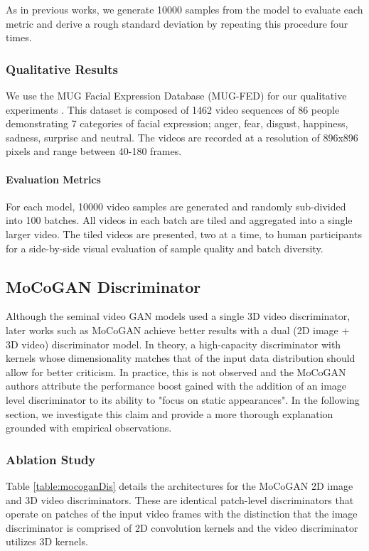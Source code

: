 \documentclass[a4paper,fleqn]{cas-sc}
\begin{document}
As in previous works, we generate 10000 samples from the model to evaluate each metric and derive a rough standard deviation by repeating this procedure four times. 

\subsubsection{Qualitative Results}
We use the MUG Facial Expression Database (MUG-FED) for our qualitative experiments \cite{AifantiPD10mug}. This dataset is composed of 1462 video sequences of 86 people demonstrating 7 categories of facial expression; anger, fear, disgust, happiness, sadness, surprise and neutral. The videos are recorded at a resolution of 896x896 pixels and range between 40-180 frames.

\paragraph{Evaluation Metrics} For each model, 10000 video samples are generated and randomly sub-divided into 100 batches. All videos in each batch are tiled and aggregated into a single larger video. The tiled videos are presented, two at a time, to human participants for a side-by-side visual evaluation of sample quality and batch diversity.


\subsection{MoCoGAN Discriminator}
\label{sec:mocogan}
Although the seminal video GAN models used a single 3D video discriminator, later works such as MoCoGAN achieve better results with a dual (2D image + 3D video) discriminator model. In theory, a high-capacity discriminator with kernels whose dimensionality matches that of the input data distribution should allow for better criticism. In practice, this is not observed and the MoCoGAN authors attribute the performance boost gained with the addition of an image level discriminator to its ability to "focus on static appearances". In the following section, we investigate this claim and provide a more thorough explanation grounded with empirical observations. 


\subsubsection{Ablation Study}
\label{sec:ablation}

Table \ref{table:mocoganDis} details the architectures for the MoCoGAN 2D image and 3D video discriminators. These are identical patch-level discriminators that operate on  patches of the input video frames with the distinction that the image discriminator is comprised of 2D convolution kernels and the video discriminator utilizes 3D kernels.
\end{document}
